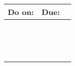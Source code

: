 \documentclass[10pt]{article}
\begin{document}
\begin{tabular*}{\textwidth}{@{\extracolsep{\fill}}lr}
Do on: & Due: \hspace{2in}~\\
\hline 
~\\
~\\
~\\
\hline 
\end{tabular*}
\end{document}
